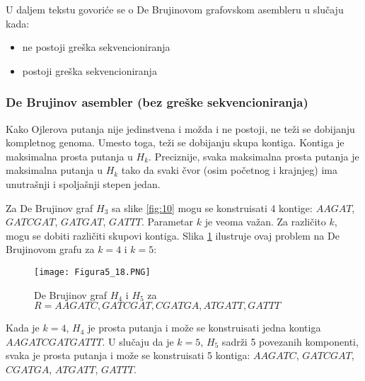 \documentclass[12pt,oneside]{memoir}
\begin{document}
U daljem tekstu govoriće se o De Brujinovom grafovskom asembleru u slučaju kada:
\begin{itemize}
    \item{ne postoji greška sekvencioniranja}
    \item{postoji greška sekvencioniranja}
\end{itemize}

\subsubsection{De Brujinov asembler (bez greške sekvencioniranja)}

Kako Ojlerova putanja nije jedinstvena i možda i ne postoji, ne teži se dobijanju kompletnog genoma. Umesto toga, teži se dobijanju skupa kontiga. Kontiga je maksimalna prosta putanja u $H_k$. Preciznije, svaka maksimalna prosta putanja je maksimalna putanja u $H_k$ tako da svaki čvor (osim početnog i krajnjeg) ima unutrašnji i spoljašnji stepen jedan. 

\begin{comment}
Slika \ref{fig:11} daje pseudokod ovog jednostavnog metoda:


\begin{figure}[!ht]
\centering
\texttt{[image: Figura5\_17.PNG]}
\caption{Jednstavan De Brujinov grafovski asmbler}
\label{fig:11}
\source{\cite{WingKinSung} str. 141, slika 5.17}
\end{figure}

\end{comment}

Za De Brujinov graf $H_3$ sa slike \ref{fig:10} mogu se konstruisati 4 kontige: $AAGAT$, $GATCGAT$, $GATGAT$, $GATTT$. Parametar $k$ je veoma važan. Za različito $k$, mogu se dobiti različiti skupovi kontiga. Slika \ref{fig:12} ilustruje ovaj problem na De Brujinovom grafu za $k = 4$ i $k = 5$:

\begin{figure}[!ht]
\centering
\texttt{[image: Figura5\_18.PNG]}
\caption{De Brujinov graf $H_4$ i $H_5$ za $R = {AAGATC, GATCGAT, CGATGA, ATGATT, GATTT}$}
\label{fig:12}
\end{figure}

Kada je $k = 4$, $H_4$ je prosta putanja i može se konstruisati jedna kontiga $AAGATCGATGATTT$. U slučaju da je $k = 5$, $H_5$ sadrži 5 povezanih komponenti, svaka je prosta putanja i može se konstruisati 5 kontiga: $AAGATC$, $GATCGAT$, $CGATGA$, $ATGATT$, $GATTT$.
\end{document}
